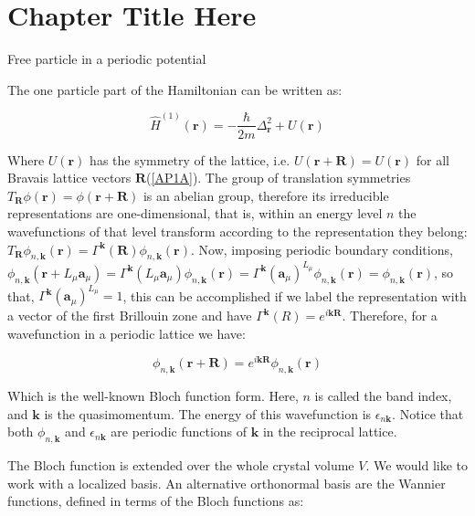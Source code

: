 \chapter{Chapter Title Here} %

\begin{section}{Free particle in a periodic potential}

The one particle part of the Hamiltonian can be written as:

\begin{equation}
\hat{H}^{(1)}(\textbf{r}) = -\frac{\hbar}{2m}\Delta^2_{\textbf{r}} + U(\textbf{r})
\end{equation}

Where $U(\textbf{r})$ has the symmetry of the lattice, i.e. $U(\textbf{r} + \textbf{R}) = U(\textbf{r})$ for all Bravais lattice vectors $\textbf{R}$(\ref{AP1A}). The group of translation symmetries $T_{\textbf{R}}\phi(\textbf{r}) = \phi(\textbf{r} + \textbf{R})$ is an abelian group, therefore its irreducible representations are one-dimensional, that is, within an energy level $n$ the wavefunctions of that level transform according to the representation they belong: $T_{\textbf{R}}\phi_{n, \textbf{k}}(\textbf{r}) = \Gamma^{\textbf{k}}(\textbf{R}) \phi_{n, \textbf{k}}(\textbf{r})$. Now, imposing periodic boundary conditions, $\phi_{n, \textbf{k}}(\textbf{r} + L_\mu \textbf{a}_\mu) = \Gamma^{\textbf{k}}(L_\mu \textbf{a}_\mu) \phi_{n, \textbf{k}}(\textbf{r}) = \Gamma^{\textbf{k}}(\textbf{a}_\mu)^{L_\mu} \phi_{n, \textbf{k}}(\textbf{r}) = \phi_{n, \textbf{k}}(\textbf{r})$, so that, $\Gamma^{\textbf{k}}(\textbf{a}_\mu)^{L_\mu} = 1$, this can be accomplished if we label the representation with a vector of the first Brillouin zone and have $\Gamma^{\textbf{k}}(R) = e^{i \textbf{k} \textbf{R}}$. Therefore, for a wavefunction in a periodic lattice we have:

\begin{equation}
\label{Bloch1}
\phi_{n, \textbf{k}}(\textbf{r}+\textbf{R}) = e^{i\textbf{k}\textbf{R}}\phi_{n, \textbf{k}} (\textbf{r})
\end{equation}

Which is the well-known Bloch function form. Here, $n$ is called the band index, and $\textbf{k}$ is the quasimomentum. The energy of this wavefunction is $\epsilon_{n \textbf{k}}$.  Notice that both $\phi_{n,\textbf{k}}$ and $\epsilon_{n \textbf{k}}$ are periodic functions of $\textbf{k}$ in the reciprocal lattice.

The Bloch function is extended over the whole crystal volume $V$. We would like to work with a localized basis. An alternative orthonormal basis are the Wannier functions, defined in terms of the Bloch functions as:


\end{section}

